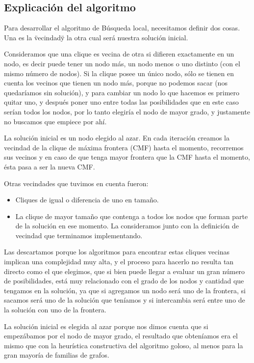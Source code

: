 \subsection{Explicaci\'on del algoritmo}

Para desarrollar el algoritmo de Búsqueda local, necesitamos definir dos cosas. Una es la \"vecindad\" y la otra cual será nuestra solución inicial.

Consideramos que una clique es vecina de otra si difieren exactamente en un nodo, es decir puede tener un nodo más, un nodo menos o uno distinto (con el mismo número de nodos). Si la clique posee un único nodo, sólo se tienen en cuenta los vecinos que tienen un nodo más, porque no podemos sacar (nos quedaríamos sin solución), y para cambiar un nodo lo que hacemos es primero quitar uno, y después poner uno entre todas las posibilidades que en este caso serían todos los nodos, por lo tanto elegiría el nodo de mayor grado, y justamente no buscamos que empiece por ahí.

La solución inicial es un nodo elegido al azar.
En cada iteración creamos la vecindad de la clique de máxima frontera (CMF) hasta el momento, recorremos sus vecinos y en caso de que tenga mayor frontera que la CMF hasta el momento, ésta pasa a ser la nueva CMF.

Otras vecindades que tuvimos en cuenta fueron:
\begin{itemize}
\item Cliques de igual o diferencia de uno en tamaño.
\item La clique de mayor tamaño que contenga a todos los nodos que forman parte de la solución en ese momento. La consideramos junto con la definición de vecindad que terminamos implementando.
\end{itemize}

Las descartamos porque los algoritmos para encontrar estas cliques vecinas implican una complejidad muy alta, y el proceso para hacerlo no resulta tan directo como el que elegimos, que si bien puede llegar a evaluar un gran número de posibilidades, está muy relacionado con el grado de los nodos y cantidad que tengamos en la solución, ya que si agregamos un nodo será uno de la frontera, si sacamos será uno de la solución que teníamos y si intercambia será entre uno de la solución con uno de la frontera.

La solución inicial es elegida al azar porque nos dimos cuenta que si empezábamos por el nodo de mayor grado, el resultado que obteníamos era el mismo que con la heurística constructiva del algoritmo goloso, al menos para la gran mayoría de familias de grafos.

